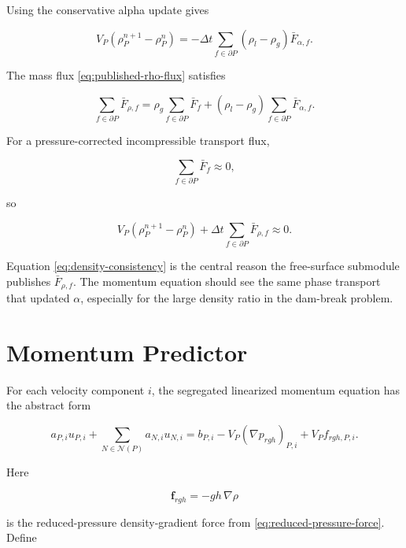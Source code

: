 \documentclass[11pt]{article}
\newcommand{\grad}{\nabla}
\newcommand{\nb}{\mathcal{N}}
\begin{document}
Using the conservative alpha update gives

\begin{equation}
  V_P(\rho_P^{n+1}-\rho_P^n)
  =
  -\Delta t
  \sum_{f\in\partial P}
  (\rho_l-\rho_g)\bar{F}_{\alpha,f}.
\end{equation}

The mass flux \eqref{eq:published-rho-flux} satisfies

\begin{equation}
  \sum_{f\in\partial P}\bar{F}_{\rho,f}
  =
  \rho_g
  \sum_{f\in\partial P}\bar{F}_f
  +
  (\rho_l-\rho_g)
  \sum_{f\in\partial P}\bar{F}_{\alpha,f}.
\end{equation}

For a pressure-corrected incompressible transport flux,

\begin{equation}
  \sum_{f\in\partial P}\bar{F}_f\approx 0,
\end{equation}

so

\begin{equation}
  V_P(\rho_P^{n+1}-\rho_P^n)
  +
  \Delta t
  \sum_{f\in\partial P}
  \bar{F}_{\rho,f}
  \approx 0.
  \label{eq:density-consistency}
\end{equation}

Equation \eqref{eq:density-consistency} is the central reason the
free-surface submodule publishes \(\bar{F}_{\rho,f}\).  The momentum equation
should see the same phase transport that updated \(\alpha\), especially for the
large density ratio in the dam-break problem.

\section{Momentum Predictor}

For each velocity component \(i\), the segregated linearized momentum equation
has the abstract form

\begin{equation}
  a_{P,i}u_{P,i}
  +
  \sum_{N\in\nb(P)}
  a_{N,i}u_{N,i}
  =
  b_{P,i}
  -
  V_P(\grad p_{rgh})_{P,i}
  +
  V_P f_{rgh,P,i}.
  \label{eq:momentum-discrete}
\end{equation}

Here

\begin{equation}
  \mathbf{f}_{rgh}=-gh\,\grad\rho
\end{equation}

is the reduced-pressure density-gradient force from
\eqref{eq:reduced-pressure-force}.  Define
\end{document}
